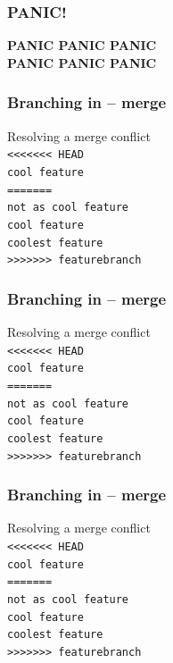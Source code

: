\documentclass{beamer}
\begin{document}
\begin{frame}
  \frametitle{PANIC!}

    \begin{center}
        \Huge \bfseries \textcolor{alertred}{PANIC PANIC PANIC \\PANIC PANIC PANIC}
    \end{center}
\end{frame}

\begin{frame}
  \frametitle{Branching in -- merge} %

    Resolving a merge conflict \\[1em]

        \texttt{<<<<<<< HEAD} \\
        \texttt{cool feature} \\
        \texttt{=======} \\
        \texttt{not as cool feature} \\
        \texttt{cool feature} \\
        \texttt{coolest feature} \\
        \texttt{>>>>>>> featurebranch}
\end{frame}

\begin{frame}
  \frametitle{Branching in -- merge} %

    Resolving a merge conflict \\[1em]

        \textcolor{alertred}{\texttt{<<<<<<< HEAD}} \\
        \texttt{cool feature} \\
        \textcolor{alertred}{\texttt{=======}} \\
        \texttt{not as cool feature} \\
        \texttt{cool feature} \\
        \texttt{coolest feature} \\
        \textcolor{alertred}{\texttt{>>>>>>> featurebranch}}
\end{frame}

\begin{frame}
  \frametitle{Branching in -- merge} %

    Resolving a merge conflict \\[1em]

        \texttt{<<<<<<< HEAD} \\
        \textcolor{alertblue}{\texttt{cool feature}} \\
        \texttt{=======} \\
        \texttt{not as cool feature} \\
        \textcolor{alertblue}{\texttt{cool feature}} \\
        \texttt{coolest feature} \\
        \texttt{>>>>>>> featurebranch}
\end{frame}
\end{document}
